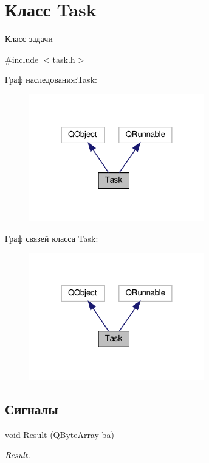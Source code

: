 \hypertarget{classTask}{}\section{Класс Task}
\label{classTask}


Класс задачи  




{\ttfamily \#include $<$task.\+h$>$}



Граф наследования\+:Task\+:\nopagebreak
\begin{figure}[H]
\begin{center}
\leavevmode
\includegraphics[width=216pt]{classTask__inherit__graph}
\end{center}
\end{figure}


Граф связей класса Task\+:\nopagebreak
\begin{figure}[H]
\begin{center}
\leavevmode
\includegraphics[width=216pt]{classTask__coll__graph}
\end{center}
\end{figure}
\subsection*{Сигналы}
\begin{DoxyCompactItemize}
\item 
void \hyperlink{classTask_a9a38657c8c17d817273b70166f35f8e2}{Result} (Q\+Byte\+Array ba)
\begin{DoxyCompactList}\small\item\em Result. \end{DoxyCompactList}\end{DoxyCompactItemize}
